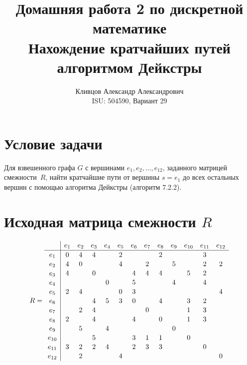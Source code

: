 \documentclass[a4paper,12pt]{article}
\title{\textbf{Домашняя работа 2 по дискретной математике}\\[0.5em]
\large Нахождение кратчайших путей алгоритмом Дейкстры}
\author{Кливцов Александр Александрович \\ ISU: 504590, Вариант 29}
\date{}
\begin{document}
\maketitle
\thispagestyle{empty}

\section*{Условие задачи}

Для взвешенного графа $G$ с вершинами $e_1, e_2, \ldots, e_{12}$, заданного матрицей
смежности~$R$, найти кратчайшие пути от вершины $s = e_1$ до всех остальных вершин
с помощью алгоритма Дейкстры (алгоритм 7.2.2).

\section*{Исходная матрица смежности $R$}

\[
	R =
	\renewcommand{\arraystretch}{1.1}
	\begin{array}{c|cccccccccccc}
		       & e_1 & e_2 & e_3 & e_4 & e_5 & e_6 & e_7 & e_8 & e_9 & e_{10} & e_{11} & e_{12} \\\hline
		e_1    & 0   & 4   & 4   &     & 2   &     &     & 2   &     &        & 3      &        \\
		e_2    & 4   & 0   &     &     & 4   &     & 2   &     & 5   &        & 2      & 2      \\
		e_3    & 4   &     & 0   &     &     & 4   & 4   & 4   &     & 5      & 2      &        \\
		e_4    &     &     &     & 0   &     & 5   &     &     & 4   &        & 4      &        \\
		e_5    & 2   & 4   &     &     & 0   & 3   &     &     &     &        &        & 4      \\
		e_6    &     &     & 4   & 5   & 3   & 0   &     & 4   &     & 3      & 2      &        \\
		e_7    &     & 2   & 4   &     &     &     & 0   &     &     & 1      & 3      &        \\
		e_8    & 2   &     & 4   &     &     & 4   &     & 0   &     & 1      & 3      &        \\
		e_9    &     & 5   &     & 4   &     &     &     &     & 0   &        &        &        \\
		e_{10} &     &     & 5   &     &     & 3   & 1   & 1   &     & 0      &        &        \\
		e_{11} & 3   & 2   & 2   & 4   &     & 2   & 3   & 3   &     &        & 0      &        \\
		e_{12} &     & 2   &     &     & 4   &     &     &     &     &        &        & 0      \\
	\end{array}
\]
\end{document}
